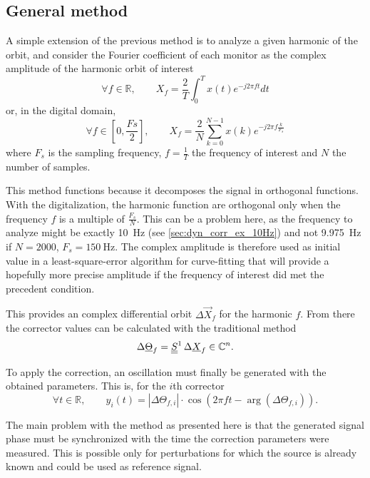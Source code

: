\subsection{General method}

A simple extension of the previous method is to analyze a given harmonic of the orbit, and consider the Fourier coefficient of each monitor as the complex amplitude of the harmonic orbit of interest
\begin{equation}
	\label{eq:orbit_extract}
	\forall f \in \mathbb{R}, \qquad X_f = \frac{2}{T} \int_0^T x(t) e^{-j 2 \pi f t} dt
\end{equation}
or, in the digital domain,
\begin{equation}
\forall f \in \left[0, \frac{Fs}{2}\right], \qquad X_f = \frac{2}{N} \sum\limits_{k=0}^{N-1} x(k) e^{-j 2 \pi f \frac{k}{F_s}}
\end{equation}
where $F_s$ is the sampling frequency, $f = \frac{1}{T}$ the frequency of interest and $N$ the number of samples.

This method functions because it decomposes the signal in orthogonal functions. With the digitalization, the harmonic function are orthogonal only when the frequency $f$ is a multiple of $\frac{F_s}{N}$. This can be a problem here, as the frequency to analyze might be exactly \SI{10}{\hertz} (see \cref{sec:dyn_corr_ex_10Hz}) and not \SI{9.975}{\hertz} if $N=2000$, $F_s=\SI{150}{\hertz}$. The complex amplitude is therefore used as initial value in a least-square-error algorithm for curve-fitting that will provide a hopefully more precise amplitude if the frequency of interest did met the precedent condition.

This provides an complex differential orbit $\Delta\vec{X}_f$ for the harmonic $f$. From there the corrector values can be calculated with the traditional method
\begin{equation}
\Delta\underline{\Theta}_f = \underline{\underline{S}}^{1}\, \Delta\underline{X}_f   \in \mathbb{C}^n.
\end{equation}

To apply the correction, an oscillation must finally be generated with the obtained parameters. This is, for the $i$th corrector
\begin{equation}\label{eq:th_dyn_corr}
\forall t \in  \mathbb{R}, \qquad y_i(t) = \left| \Delta\Theta_{f,i} \right| \cdot \cos\left(2 \pi f t - \arg\left(\Delta\Theta_{f,i}\right)\right).
\end{equation}

The main problem with the method as presented here is that the generated signal phase must be synchronized with the time the correction parameters were measured. This is possible only for perturbations for which the source is already known and could be used as reference signal.

